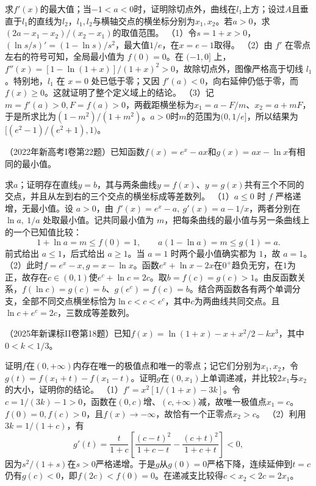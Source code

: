 \quad {}求\(f'(x)\)的最大值；当\(-1<a<0\)时，证明除切点外，曲线在\(l_1\)上方；设过\(A\)且垂直于\(l_1\)的直线为\(l_2\)，\(l_1,l_2\)与横轴交点的横坐标分别为\(x_1,x_2\)。若\(a>0\)，求\((2a-x_1-x_2)/(x_2-x_1)\)的取值范围。
\solutionanswer
（1）令\(s=1+x>0\)，\((\ln s/s)'=(1-\ln s)/s^2\)，最大值\(1/e\)，在\(x=e-1\)取得。
（2）由 \(f'\) 在零点左右的符号可知，全局最小值为 \(f(0)=0\)。在 \((-1,0]\) 上，\(f''(x)=[1-\ln(1+x)]/(1+x)^2>0\)，故除切点外，图像严格高于切线 \(l_1\)。特别地，\(l_1\) 在 \(x=0\) 处已低于零；又因 \(f'(a)<0\)，向右延伸仍低于零，而 \(f(x)\ge0\)。这就证明了整个定义域上的结论。
（3）记\(m=f'(a)>0,F=f(a)>0\)，两截距横坐标为\(x_1=a-F/m\)、\(x_2=a+mF\)，于是所求比为\((1-m^2)/(1+m^2)\)。\(a>0\)时\(m\)的范围为\((0,1/e]\)，所以结果为\([(e^2-1)/(e^2+1),1)\)。


（2022年新高考I卷第22题）已知函数\(f(x)=e^x-ax\)和\(g(x)=ax-\ln x\)有相同的最小值。

\quad {}求\(a\)；证明存在直线\(y=b\)，其与两条曲线\(y=f(x)\)、\(y=g(x)\)共有三个不同的交点，并且从左到右的三个交点的横坐标成等差数列。
\solutionanswer
（1）\(a\le0\) 时 \(f\) 严格递增，无最小值。设 \(a>0\)，由 \(f'(x)=e^x-a,\ g'(x)=a-1/x\)，两者分别在 \(\ln a,\ 1/a\) 处取最小值。记共同最小值为 \(m\)，把每条曲线的最小值与另一条曲线上的一个已知值比较：
\[
 1+\ln a=m\le f(0)=1,\qquad a(1-\ln a)=m\le g(1)=a .
\]
前式给出 \(a\le1\)，后式给出 \(a\ge1\)。当 \(a=1\) 时两个最小值确实都为 \(1\)，故 \(a=1\)。
（2）此时\(f=e^x-x,g=x-\ln x\)。函数\(e^x+\ln x-2x\)在\(0^+\)趋负无穷，在\(1\)为正，故存在\(c\in(0,1)\)使\(e^c+\ln c=2c\)。取\(b=f(c)=g(c)>1\)。由反函数关系，\(f(\ln c)=g(c)=b\)、\(g(e^c)=f(c)=b\)。结合两函数各有两个单调分支，全部不同交点横坐标恰为\(\ln c<c<e^c\)，其中\(c\)为两曲线共同交点。且\(\ln c+e^c=2c\)，三数成等差数列。


（2025年新课标II卷第18题）已知\(f(x)=\ln(1+x)-x+x^2/2-kx^3\)，其中\(0<k<1/3\)。

\quad {}证明\(f\)在\((0,+\infty)\)内存在唯一的极值点和唯一的零点；记它们分别为\(x_1,x_2\)，令\(g(t)=f(x_1+t)-f(x_1-t)\)。证明\(g\)在\((0,x_1)\)上单调递减，并比较\(2x_1\)与\(x_2\)的大小，证明你的结论。
\solutionanswer
（1）\(f'=x^2[1/(1+x)-3k]\)。令\(c=1/(3k)-1>0\)，函数在\((0,c)\)增、\((c,+\infty)\)减，故唯一极值点\(x_1=c\)。\(f(0)=0,f(c)>0\)，且\(f(x)\to-\infty\)，故恰有一个正零点\(x_2>c\)。
（2）利用\(3k=1/(1+c)\)，有
\[
 g'(t)=\frac t{1+c}\left[\frac{(c-t)^2}{1+c-t}-\frac{(c+t)^2}{1+c+t}\right]<0,
\]
因为\(s^2/(1+s)\)在\(s>0\)严格递增。于是\(g\)从\(g(0)=0\)严格下降，连续延伸到\(t=c\)仍有\(g(c)<0\)，即\(f(2c)<f(0)=0\)。在递减支比较得\(c<x_2<2c=2x_1\)。


